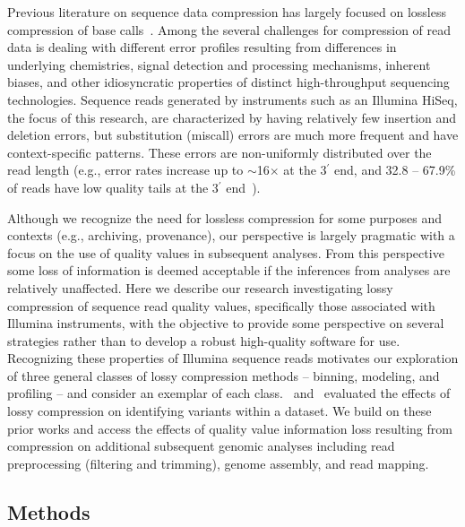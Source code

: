 Previous literature on sequence data compression has largely focused
on lossless compression of base calls~\cite{asnani2012lossy,Canovas:2014fr,Hach:2012ys,
  janin2013adaptive,Kozanitis:2011kl,Ochoa:2013rt,Tembe:2010ys,
  Wan:2012kq,DBLP:conf/recomb/YuYB14,zhou2014compression}. Among the
several challenges for compression of read data is dealing with
different error profiles resulting from differences in underlying
chemistries, signal detection and processing mechanisms, inherent
biases, and other idiosyncratic properties of distinct high-throughput
sequencing technologies. Sequence reads generated by instruments such
as an Illumina HiSeq, the focus of this research, are characterized by
having relatively few insertion and deletion errors, but substitution
(miscall) errors are much more frequent and have context-specific
patterns. These errors are non-uniformly distributed over the read
length (e.g., error rates increase up to $\sim$16$\times$ at the
3$^{\prime}$ end, and 32.8 -- 67.9\% of reads have low quality tails
at the 3$^{\prime}$ end~\cite{Minoche:2011km}).

Although we recognize the need for lossless compression for some
purposes and contexts (e.g., archiving, provenance), our perspective
is largely pragmatic with a focus on the use of quality values in
subsequent analyses. From this perspective some loss of information is
deemed acceptable if the inferences from analyses are relatively
unaffected. Here we describe our research investigating lossy
compression of sequence read quality values, specifically those
associated with Illumina instruments, with the objective to provide
some perspective on several strategies rather than to develop a robust
high-quality software for use. Recognizing these properties of
Illumina sequence reads motivates our exploration of three general
classes of lossy compression methods -- binning, modeling, and
profiling -- and consider an exemplar of each class.~\cite{Canovas:2014fr} and~\cite{janin2013adaptive} evaluated the effects of lossy compression on identifying variants within a dataset. We build on these prior works and access the effects of
quality value information loss resulting from compression on additional
subsequent genomic analyses including read preprocessing (filtering
and trimming), genome assembly, and read mapping.

\subsection{Methods}


